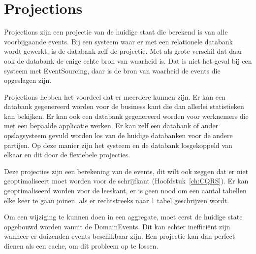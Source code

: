 
\section{Projections}
\label{sec:projections}

Projections zijn een projectie van de huidige staat die berekend is van alle voorbijgaande events. Bij een systeem waar er met een relationele databank wordt gewerkt, is de databank zelf de projectie. Met als grote verschil dat daar ook de databank de enige echte bron van waarheid is. Dat is niet het geval bij een systeem met EventSourcing, daar is de bron van waarheid de events die opgeslagen zijn.

Projections hebben het voordeel dat er meerdere kunnen zijn. Er kan een databank gegenereerd worden voor de business kant die dan allerlei statistieken kan bekijken. Er kan ook een databank gegenereerd worden voor werknemers die met een bepaalde applicatie werken. Er kan zelf een databank of ander opslagsysteem gevuld worden los van de huidige databanken voor de andere partijen. Op deze manier zijn het systeem en de databank losgekoppeld van elkaar en dit door de flexiebele projecties. 

Deze projecties zijn een berekening van de events, dit wilt ook zeggen dat er niet geoptimaliseert moet worden voor de schrijfkant (Hoofdstuk~\ref{ch:CQRS}). Er kan geoptimaliseerd worden voor de leeskant, er is geen nood om een aantal tabellen elke keer te gaan joinen, als er rechtstreeks naar 1 tabel geschrijven wordt.

Om een wijziging te kunnen doen in een aggregate, moet eerst de huidige state opgebouwd worden vanuit de DomainEvents. Dit kan echter inefficiënt zijn wanneer er duizenden events beschikbaar zijn. Een projectie kan dan perfect dienen als een cache, om dit probleem op te lossen.